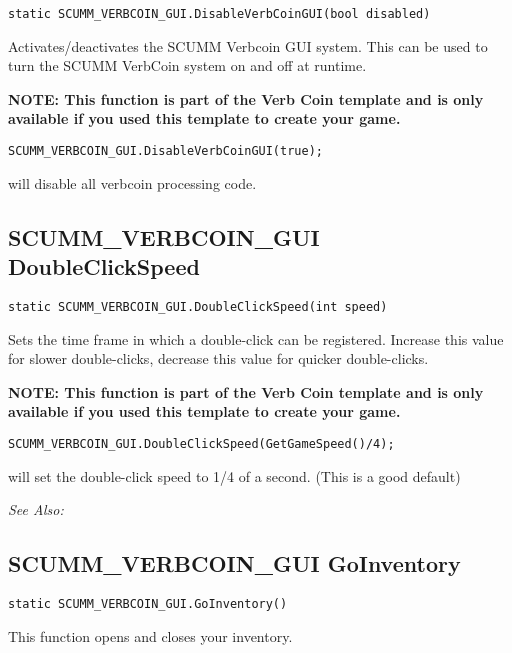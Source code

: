 \begin{verbatim}
static SCUMM_VERBCOIN_GUI.DisableVerbCoinGUI(bool disabled)
\end{verbatim}
Activates/deactivates the SCUMM Verbcoin GUI system. This can be used to turn the SCUMM
VerbCoin system on and off at runtime.

\bf{NOTE:} This function is part of the Verb Coin template and is only available if
you used this template to create your game.

\begin{verbatim}
SCUMM_VERBCOIN_GUI.DisableVerbCoinGUI(true);
\end{verbatim}

will disable all verbcoin processing code.


\subsection{SCUMM_VERBCOIN_GUI DoubleClickSpeed}\label{SCUMM_VERBCOIN_GUI.DoubleClickSpeed}%

\begin{verbatim}
static SCUMM_VERBCOIN_GUI.DoubleClickSpeed(int speed)
\end{verbatim}
Sets the time frame in which a double-click can be registered. Increase this value
for slower double-clicks, decrease this value for quicker double-clicks.

\bf{NOTE:} This function is part of the Verb Coin template and is only available if
you used this template to create your game.

\begin{verbatim}
SCUMM_VERBCOIN_GUI.DoubleClickSpeed(GetGameSpeed()/4);
\end{verbatim}

will set the double-click speed to 1/4 of a second. (This is a good default)

\it{See Also:} 


\subsection{SCUMM_VERBCOIN_GUI GoInventory}\label{SCUMM_VERBCOIN_GUI.GoInventory}%

\begin{verbatim}
static SCUMM_VERBCOIN_GUI.GoInventory()
\end{verbatim}
This function opens and closes your inventory.

